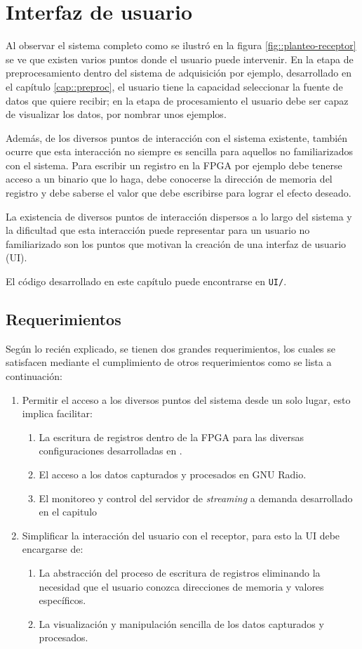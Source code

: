 \documentclass[../../main.tex]{subfiles}
\begin{document}
\graphicspath{{./figures}}
\chapter{Interfaz de usuario}
Al observar el sistema completo como se ilustró en la figura \ref{fig::planteo-receptor} se ve que existen varios puntos donde el usuario puede intervenir. En la etapa de preprocesamiento dentro del sistema de adquisición por ejemplo, desarrollado en el capítulo \ref{cap::preproc}, el usuario tiene la capacidad seleccionar la fuente de datos que quiere recibir; en la etapa de procesamiento el usuario debe ser capaz de visualizar los datos, por nombrar unos ejemplos.

Además, de los diversos puntos de interacción con el sistema existente, también ocurre que esta interacción no siempre es sencilla para aquellos no familiarizados con el sistema. Para escribir un registro en la FPGA por ejemplo debe tenerse acceso a un binario que lo haga, debe conocerse la dirección de memoria del registro y debe saberse el valor que debe escribirse para lograr el efecto deseado.

La existencia de diversos puntos de interacción dispersos a lo largo del sistema y la dificultad que esta interacción puede representar para un usuario no familiarizado son los puntos que motivan la creación de una interfaz de usuario (UI).

El código desarrollado en este capítulo puede encontrarse en \texttt{UI/}.

\section{Requerimientos}
Según lo recién explicado, se tienen dos grandes requerimientos, los cuales se satisfacen mediante el cumplimiento de otros requerimientos como se lista a continuación:
\begin{enumerate}
    \item Permitir el acceso a los diversos puntos del sistema desde un solo lugar, esto implica facilitar:
    \begin{enumerate}
        \item La escritura de registros dentro de la FPGA para las diversas configuraciones desarrolladas en .
        \item El acceso a los datos capturados y procesados en GNU Radio.
        \item El monitoreo y control del servidor de \textit{streaming} a demanda desarrollado en el capitulo 
    \end{enumerate}
    \item Simplificar la interacción del usuario con el receptor, para esto la UI debe encargarse de:
    \begin{enumerate}
        \item La abstracción del proceso de escritura de registros eliminando la necesidad que el usuario conozca direcciones de memoria y valores específicos.
        \item La visualización y manipulación sencilla de los datos capturados y procesados.
    \end{enumerate}
\end{enumerate}
\end{document}
